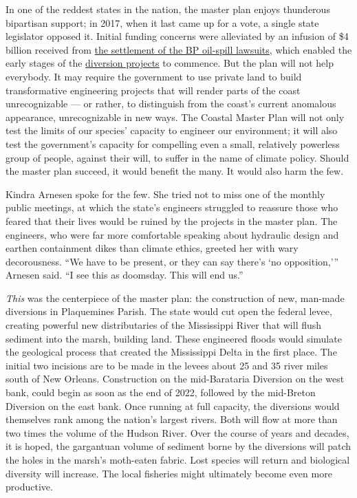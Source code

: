 In one of the reddest states in the nation, the master plan enjoys
thunderous bipartisan support; in 2017, when it last came up for a vote,
a single state legislator opposed it. Initial funding concerns were
alleviated by an infusion of \$4 billion received from
\href{https://www.nytimes3xbfgragh.onion/2012/03/03/us/accord-reached-settling-lawsuit-over-bp-oil-spill.html}{the
settlement of the BP oil-spill lawsuits}, which enabled the early stages
of the
\href{http://coastal.la.gov/our-work/key-initiatives/diversion-program/}{diversion
projects} to commence. But the plan will not help everybody. It may
require the government to use private land to build transformative
engineering projects that will render parts of the coast unrecognizable
--- or rather, to distinguish from the coast's current anomalous
appearance, unrecognizable in new ways. The Coastal Master Plan will not
only test the limits of our species' capacity to engineer our
environment; it will also test the government's capacity for compelling
even a small, relatively powerless group of people, against their will,
to suffer in the name of climate policy. Should the master plan succeed,
it would benefit the many. It would also harm the few.

Kindra Arnesen spoke for the few. She tried not to miss one of the
monthly public meetings, at which the state's engineers struggled to
reassure those who feared that their lives would be ruined by the
projects in the master plan. The engineers, who were far more
comfortable speaking about hydraulic design and earthen containment
dikes than climate ethics, greeted her with wary decorousness. ``We have
to be present, or they can say there's `no opposition,''' Arnesen said.
``I see this as doomsday. This will end us.''

\emph{This} was the centerpiece of the master plan: the construction of
new, man-made diversions in Plaquemines Parish. The state would cut open
the federal levee, creating powerful new distributaries of the
Mississippi River that will flush sediment into the marsh, building
land. These engineered floods would simulate the geological process that
created the Mississippi Delta in the first place. The initial two
incisions are to be made in the levees about 25 and 35 river miles south
of New Orleans. Construction on the mid-Barataria Diversion on the west
bank, could begin as soon as the end of 2022, followed by the mid-Breton
Diversion on the east bank. Once running at full capacity, the
diversions would themselves rank among the nation's largest rivers. Both
will flow at more than two times the volume of the Hudson River. Over
the course of years and decades, it is hoped, the gargantuan volume of
sediment borne by the diversions will patch the holes in the marsh's
moth-eaten fabric. Lost species will return and biological diversity
will increase. The local fisheries might ultimately become even more
productive.

